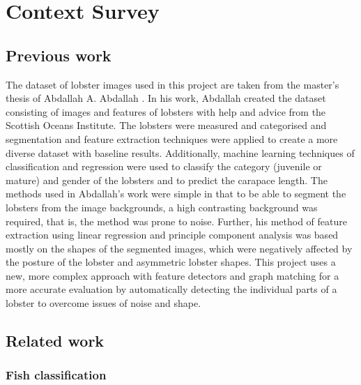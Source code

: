 \section{Context Survey}
\renewcommand{\imgpath}{tex/litreview/imgs}

\subsection{Previous work}
The dataset of lobster images used in this project are taken from the master's thesis of Abdallah A. Abdallah \cite{lobster-thesis}. In his work, Abdallah created the dataset consisting of images and features of lobsters with help and advice from the Scottish Oceans Institute. The lobsters were measured and categorised and segmentation and feature extraction techniques were applied to create a more diverse dataset with baseline results. Additionally, machine learning techniques of classification and regression were used to classify the category (juvenile or mature) and gender of the lobsters and to predict the carapace length. 
\n
The methods used in Abdallah's work were simple in that to be able to segment the lobsters from the image backgrounds, a high contrasting background was required, that is, the method was prone to noise. Further, his method of feature extraction using linear regression and principle component analysis was based mostly on the shapes of the segmented images, which were negatively affected by the posture of the lobster and asymmetric lobster shapes. This project uses a new, more complex approach with feature detectors and graph matching for a more accurate evaluation by automatically detecting the individual parts of a lobster to overcome issues of noise and shape. 

\subsection{Related work}

\subsubsection{Fish classification}

